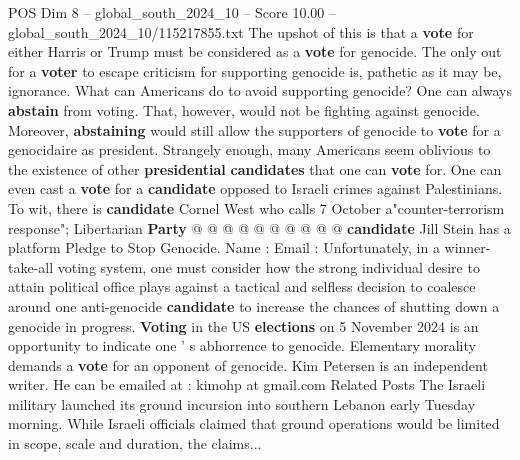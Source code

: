 \begin{textsample}{POS Dim 8 – global\_south\_2024\_10 – Score 10.00 – global\_south\_2024\_10/115217855.txt}
The upshot of this is that a \textbf{vote} for either Harris or Trump must be considered as a \textbf{vote} for genocide.
The only out for a \textbf{voter} to escape criticism for supporting genocide is, pathetic as it may be, ignorance.
What can Americans do to avoid supporting genocide?
One can always \textbf{abstain} from voting.
That, however, would not be fighting against genocide.
Moreover, \textbf{abstaining} would still allow the supporters of genocide to \textbf{vote} for a genocidaire as president.
Strangely enough, many Americans seem oblivious to the existence of other \textbf{presidential} \textbf{candidates} that one can \textbf{vote} for.
One can even cast a \textbf{vote} for a \textbf{candidate} opposed to Israeli crimes against Palestinians.
To wit, there is \textbf{candidate} Cornel West who calls 7 October a"counter-terrorism response"; Libertarian \textbf{Party} @ @ @ @ @ @ @ @ @ @ \textbf{candidate} Jill Stein has a platform Pledge to Stop Genocide.
Name : Email : Unfortunately, in a winner-take-all voting system, one must consider how the strong individual desire to attain political office plays against a tactical and selfless decision to coalesce around one anti-genocide \textbf{candidate} to increase the chances of shutting down a genocide in progress. \textbf{Voting} in the US \textbf{elections} on 5 November 2024 is an opportunity to indicate one ' s abhorrence to genocide.
Elementary morality demands a \textbf{vote} for an opponent of genocide.
Kim Petersen is an independent writer.
He can be emailed at : kimohp at gmail.com Related Posts The Israeli military launched its ground incursion into southern Lebanon early Tuesday morning.
While Israeli officials claimed that ground operations would be limited in scope, scale and duration, the claims...

\end{textsample}
